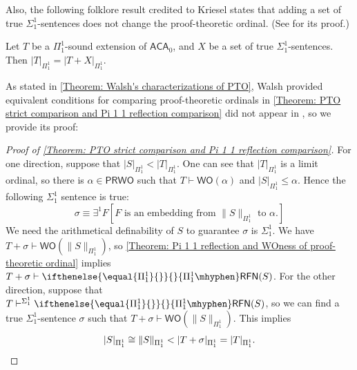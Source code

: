 \documentclass{mhkr}
\newcommand{\added}[1]{#1}
\newcommand{\WO}{\mathsf{WO}}
\newcommand{\RFN}[1][]{\ifthenelse{\equal{#1}{}}{}{#1\mhyphen}\mathsf{RFN}}
\newcommand{\ACA}{\mathsf{ACA}}
\begin{document}
\added{
Also, the following folklore result credited to Kriesel states that adding a set of true $\Sigma^1_1$-sentences does not change the proof-theoretic ordinal. (See \cite[Proposition 2.1]{Walsh2023characterizations} for its proof.)
\begin{theorem} \pushQED{\qed} \label{Theorem: Kriesel's theorem on PTO}
    Let $T$ be a $\Pi^1_1$-sound extension of $\ACA_0$, and $X$ be a set of true $\Sigma^1_1$-sentences. Then $|T|_{\Pi^1_1} = |T + X|_{\Pi^1_1}$. \qedhere 
\end{theorem}

As stated in \autoref{Theorem: Walsh's characterizations of PTO}, Walsh provided equivalent conditions for comparing proof-theoretic ordinals in \cite{Walsh2022incompleteness} \autoref{Theorem: PTO strict comparison and Pi 1 1 reflection comparison} did not appear in \cite{Walsh2022incompleteness}, so we provide its proof:
\begin{proof}[Proof of \autoref{Theorem: PTO strict comparison and Pi 1 1 reflection comparison}]
    For one direction, suppose that $|S|_{\Pi^1_1} < |T|_{\Pi^1_1}$. One can see that $|T|_{\Pi^1_1}$ is a limit ordinal, so there is $\alpha\in \mathsf{PRWO}$ such that $T\vdash \WO(\alpha)$ and $|S|_{\Pi^1_1}\le \alpha$. Hence the following $\Sigma^1_1$ sentence is true:
    \begin{equation*}
        \sigma \equiv \exists^1 F [\text{$F$ is an embedding from $\|S\|_{\Pi^1_1}$ to $\alpha$.}]
    \end{equation*}
    We need the arithmetical definability of $S$ to guarantee $\sigma$ is $\Sigma^1_1$. We have $T+\sigma\vdash \WO(\|S\|_{\Pi^1_1})$, so \autoref{Theorem: Pi 1 1 reflection and WOness of proof-theoretic ordinal} implies $T+\sigma \vdash \RFN[\Pi^1_1](S)$.
    For the other direction, suppose that $T\vdash^{\Sigma^1_1} \RFN[\Pi^1_1](S)$, so we can find a true $\Sigma^1_1$-sentence $\sigma$ such that $T+\sigma\vdash \WO(\|S\|_{\Pi^1_1})$. This implies 
    \begin{equation*}
        |S|_{\Pi^1_1} \cong \|S\|_{\Pi^1_1} < |T + \sigma|_{\Pi^1_1} = |T|_{\Pi^1_1}.
        \qedhere 
    \end{equation*}
\end{proof}
}
\end{document}
